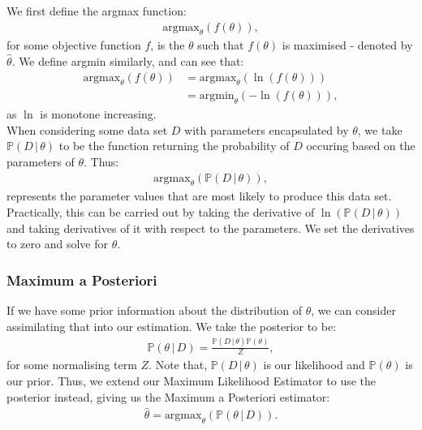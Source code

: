 We first define the argmax function:
\begin{gather*}
    \text{argmax}_\theta(f(\theta)),
\end{gather*} for some objective function $f$, is the $\theta$
such that $f(\theta)$ is maximised - denoted by $\hat\theta$.
We define argmin similarly, and can see that:
\begin{align*}
    \text{argmax}_\theta(f(\theta)) 
    &= \text{argmax}_\theta(\ln(f(\theta))) \\
    &= \text{argmin}_\theta(-\ln(f(\theta))),
\end{align*} as $\ln$ is monotone increasing.
\\[\baselineskip]
When considering some data set $D$ with parameters
encapsulated by $\theta$, we take $\mathbb{P}(D \, | \, \theta)$ 
to be the function returning the probability of $D$ occuring based 
on the parameters of $\theta$. Thus: \begin{gather*}
    \text{argmax}_\theta(\mathbb{P}(D \, | \, \theta)),
\end{gather*} represents the parameter values that
are most likely to produce this data set. Practically,
this can be carried out by taking the derivative of
$\ln(\mathbb{P}(D \, | \, \theta))$ and taking derivatives 
of it with respect to the parameters. We set the derivatives
to zero and solve for $\theta$.

\subsubsection{Maximum a Posteriori}

If we have some prior information about the distribution of
$\theta$, we can consider assimilating that into our estimation.
We take the posterior to be: \begin{gather*}
    \mathbb{P}(\theta \, | \, D) 
    = \frac{
        \mathbb{P}(D \, | \, \theta)\mathbb{P}(\theta)
        }{Z},
\end{gather*} for some normalising term $Z$. Note that,
$\mathbb{P}(D \, | \, \theta)$ is our likelihood and 
$\mathbb{P}(\theta)$ is our prior. Thus, we extend
our Maximum Likelihood Estimator to use the posterior instead,
giving us the Maximum a Posteriori estimator: \begin{gather*}
    \hat\theta = \text{argmax}_\theta(\mathbb{P}(\theta \, | \, D)).
\end{gather*}